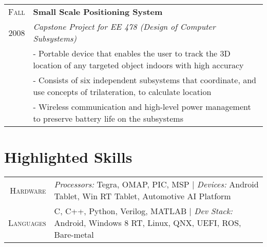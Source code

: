 \documentclass[letter,10pt]{article}
\begin{document}
\begin{tabular}{r|p{16cm}}
\textsc{Fall} & \textbf{Small Scale Positioning System}\\
\textsc{2008} &\emph{Capstone Project for EE 478 (Design of Computer Subsystems)}\\
&\footnotesize{
 - Portable device that enables the user to track the 3D location of any targeted object indoors with high accuracy
}\\
&\footnotesize{
 - Consists of six independent subsystems that coordinate, and use concepts of trilateration, to calculate location
}\\
&\footnotesize{
 - Wireless communication and high-level power management to preserve battery life on the subsystems
}\\

\end{tabular}

\section{Highlighted Skills}

\begin{tabular}{r|p{16cm}}

\textsc{Hardware} & \emph{Processors: } Tegra, OMAP, PIC, MSP | \emph{Devices: } Android Tablet, Win RT Tablet, Automotive AI Platform \\%
\textsc{Languages} & C, C++, Python, Verilog, MATLAB | \emph{Dev Stack: } Android, Windows 8 RT, Linux, QNX, UEFI, ROS, Bare-metal\\%

\end{tabular}
\end{document}
